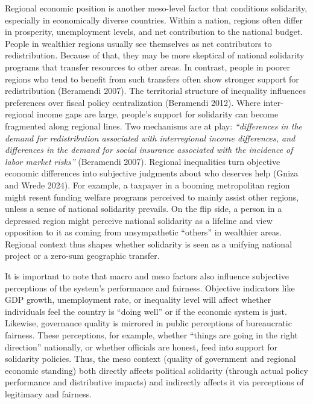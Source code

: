 \documentclass[12pt]{article}
\begin{document}
Regional economic position is another meso-level factor that conditions
solidarity, especially in economically diverse countries. Within a
nation, regions often differ in prosperity, unemployment levels, and net
contribution to the national budget. People in wealthier regions usually
see themselves as net contributors to redistribution. Because of that,
they may be more skeptical of national solidarity programs that transfer
resources to other areas. In contrast, people in poorer regions who tend
to benefit from such transfers often show stronger support for
redistribution (Beramendi 2007). The territorial structure of inequality
influences preferences over fiscal policy centralization (Beramendi
2012). Where inter-regional income gaps are large, people's support for
solidarity can become fragmented along regional lines. Two mechanisms
are at play: \emph{``differences in the demand for redistribution
associated with interregional income differences, and differences in the
demand for social insurance associated with the incidence of labor
market risks''} (Beramendi 2007). Regional inequalities turn objective
economic differences into subjective judgments about who deserves help
(Gniza and Wrede 2024). For example, a taxpayer in a booming
metropolitan region might resent funding welfare programs perceived to
mainly assist other regions, unless a sense of national solidarity
prevails. On the flip side, a person in a depressed region might
perceive national solidarity as a lifeline and view opposition to it as
coming from unsympathetic ``others'' in wealthier areas. Regional
context thus shapes whether solidarity is seen as a unifying national
project or a zero-sum geographic transfer.

It is important to note that macro and meso factors also influence
subjective perceptions of the system's performance and fairness.
Objective indicators like GDP growth, unemployment rate, or inequality
level will affect whether individuals feel the country is ``doing well''
or if the economic system is just. Likewise, governance quality is
mirrored in public perceptions of bureaucratic fairness. These
perceptions, for example, whether ``things are going in the right
direction'' nationally, or whether officials are honest, feed into
support for solidarity policies. Thus, the meso context (quality of
government and regional economic standing) both directly affects
political solidarity (through actual policy performance and distributive
impacts) and indirectly affects it via perceptions of legitimacy and
fairness.
\end{document}
